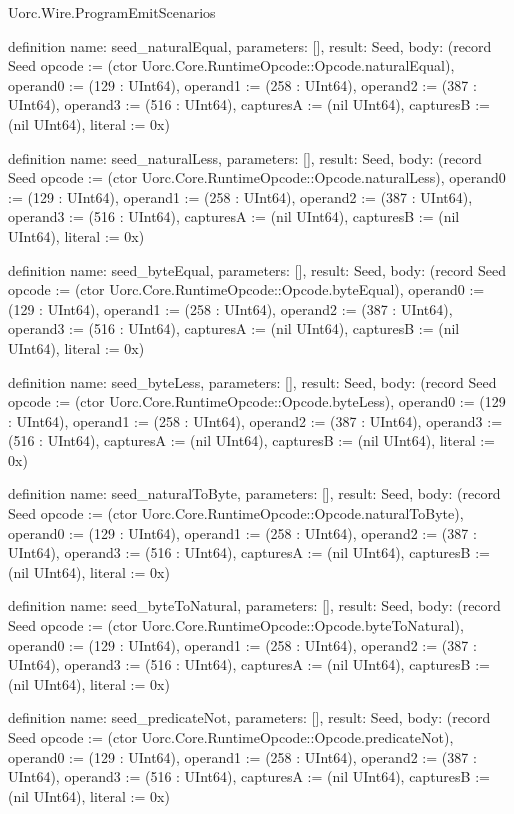 \begin{lexlean}{Uorc.Wire.ProgramEmitScenarios}
\begin{semanticmodule}
definition{
  name: seed_naturalEqual,
  parameters: [],
  result: Seed,
  body: (record Seed {opcode := (ctor Uorc.Core.RuntimeOpcode::Opcode.naturalEqual), operand0 := (129 : UInt64), operand1 := (258 : UInt64), operand2 := (387 : UInt64), operand3 := (516 : UInt64), capturesA := (nil UInt64), capturesB := (nil UInt64), literal := 0x})
}

definition{
  name: seed_naturalLess,
  parameters: [],
  result: Seed,
  body: (record Seed {opcode := (ctor Uorc.Core.RuntimeOpcode::Opcode.naturalLess), operand0 := (129 : UInt64), operand1 := (258 : UInt64), operand2 := (387 : UInt64), operand3 := (516 : UInt64), capturesA := (nil UInt64), capturesB := (nil UInt64), literal := 0x})
}

definition{
  name: seed_byteEqual,
  parameters: [],
  result: Seed,
  body: (record Seed {opcode := (ctor Uorc.Core.RuntimeOpcode::Opcode.byteEqual), operand0 := (129 : UInt64), operand1 := (258 : UInt64), operand2 := (387 : UInt64), operand3 := (516 : UInt64), capturesA := (nil UInt64), capturesB := (nil UInt64), literal := 0x})
}

definition{
  name: seed_byteLess,
  parameters: [],
  result: Seed,
  body: (record Seed {opcode := (ctor Uorc.Core.RuntimeOpcode::Opcode.byteLess), operand0 := (129 : UInt64), operand1 := (258 : UInt64), operand2 := (387 : UInt64), operand3 := (516 : UInt64), capturesA := (nil UInt64), capturesB := (nil UInt64), literal := 0x})
}

definition{
  name: seed_naturalToByte,
  parameters: [],
  result: Seed,
  body: (record Seed {opcode := (ctor Uorc.Core.RuntimeOpcode::Opcode.naturalToByte), operand0 := (129 : UInt64), operand1 := (258 : UInt64), operand2 := (387 : UInt64), operand3 := (516 : UInt64), capturesA := (nil UInt64), capturesB := (nil UInt64), literal := 0x})
}

definition{
  name: seed_byteToNatural,
  parameters: [],
  result: Seed,
  body: (record Seed {opcode := (ctor Uorc.Core.RuntimeOpcode::Opcode.byteToNatural), operand0 := (129 : UInt64), operand1 := (258 : UInt64), operand2 := (387 : UInt64), operand3 := (516 : UInt64), capturesA := (nil UInt64), capturesB := (nil UInt64), literal := 0x})
}

definition{
  name: seed_predicateNot,
  parameters: [],
  result: Seed,
  body: (record Seed {opcode := (ctor Uorc.Core.RuntimeOpcode::Opcode.predicateNot), operand0 := (129 : UInt64), operand1 := (258 : UInt64), operand2 := (387 : UInt64), operand3 := (516 : UInt64), capturesA := (nil UInt64), capturesB := (nil UInt64), literal := 0x})
}


\end{semanticmodule}
\end{lexlean}
